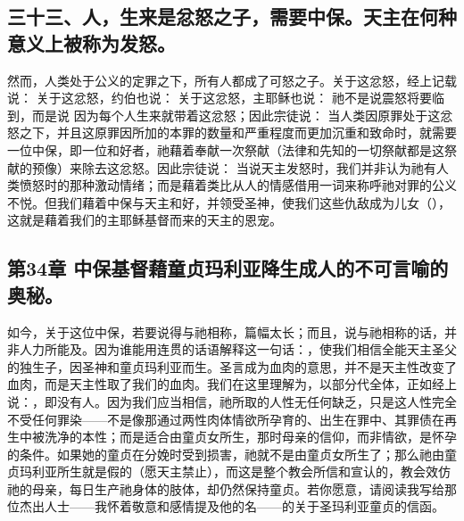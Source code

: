 
\subsection{三十三、人，生来是忿怒之子，需要中保。天主在何种意义上被称为发怒。}

然而，人类处于公义的定罪之下，所有人都成了可怒之子。关于这忿怒，经上记载说： 关于这忿怒，约伯也说： 关于这忿怒，主耶稣也说： 祂不是说震怒将要临到，而是说 因为每个人生来就带着这忿怒；因此宗徒说： 当人类因原罪处于这忿怒之下，并且这原罪因所加的本罪的数量和严重程度而更加沉重和致命时，就需要一位中保，即一位和好者，祂藉着奉献一次祭献（法律和先知的一切祭献都是这祭献的预像）来除去这忿怒。因此宗徒说： 当说天主发怒时，我们并非认为祂有人类愤怒时的那种激动情绪；而是藉着类比从人的情感借用一词来称呼祂对罪的公义不悦。但我们藉着中保与天主和好，并领受圣神，使我们这些仇敌成为儿女（），这就是藉着我们的主耶稣基督而来的天主的恩宠。\par


\subsection{第34章 中保基督藉童贞玛利亚降生成人的不可言喻的奥秘。}

如今，关于这位中保，若要说得与祂相称，篇幅太长；而且，说与祂相称的话，并非人力所能及。因为谁能用连贯的话语解释这一句话：，使我们相信全能天主圣父的独生子，因圣神和童贞玛利亚而生。圣言成为血肉的意思，并不是天主性改变了血肉，而是天主性取了我们的血肉。我们在这里理解为，以部分代全体，正如经上说：，即没有人。因为我们应当相信，祂所取的人性无任何缺乏，只是这人性完全不受任何罪染——不是像那通过两性肉体情欲所孕育的、出生在罪中、其罪债在再生中被洗净的本性；而是适合由童贞女所生，那时母亲的信仰，而非情欲，是怀孕的条件。如果她的童贞在分娩时受到损害，祂就不是由童贞女所生了；那么祂由童贞玛利亚所生就是假的（愿天主禁止），而这是整个教会所信和宣认的，教会效仿祂的母亲，每日生产祂身体的肢体，却仍然保持童贞。若你愿意，请阅读我写给那位杰出人士——我怀着敬意和感情提及他的名——的关于圣玛利亚童贞的信函。\par

